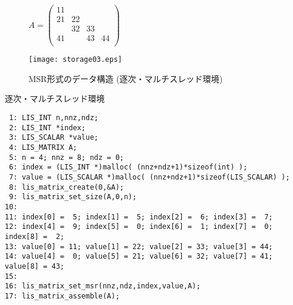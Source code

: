 \documentclass[a4paper]{jarticle}
\begin{document}
{{\begin{figure}[h]
{\centering 
\begin{minipage}{0.3\textwidth}
\begin{flushright}
$ 
A = \left(
\begin{array}{cccc}
11 &    &    &    \\
21 & 22 &    &    \\
   & 32 & 33 &    \\
41 &    & 43 & 44 \\
\end{array}\right)
$
\end{flushright}
\end{minipage}
\begin{minipage}{0.6\textwidth}
\begin{flushleft}
\texttt{[image: storage03.eps]} 
\end{flushleft}
\end{minipage}
\caption{MSR形式のデータ構造 (逐次・マルチスレッド環境)}\label{fig:storage03}}
\end{figure}
\begin{itembox}[l]{逐次・マルチスレッド環境}
\small
\begin{verbatim}
 1: LIS_INT n,nnz,ndz;
 2: LIS_INT *index;
 3: LIS_SCALAR *value;
 4: LIS_MATRIX A;
 5: n = 4; nnz = 8; ndz = 0;
 6: index = (LIS_INT *)malloc( (nnz+ndz+1)*sizeof(int) );
 7: value = (LIS_SCALAR *)malloc( (nnz+ndz+1)*sizeof(LIS_SCALAR) );
 8: lis_matrix_create(0,&A);
 9: lis_matrix_set_size(A,0,n);
10:
11: index[0] =  5; index[1] =  5; index[2] =  6; index[3] =  7;
12: index[4] =  9; index[5] =  0; index[6] =  1; index[7] =  0; index[8] =  2;
13: value[0] = 11; value[1] = 22; value[2] = 33; value[3] = 44;
14: value[4] =  0; value[5] = 21; value[6] = 32; value[7] = 41; value[8] = 43;
15:
16: lis_matrix_set_msr(nnz,ndz,index,value,A);
17: lis_matrix_assemble(A);
\end{verbatim}
\end{itembox}

\newpage
}}
\end{document}
